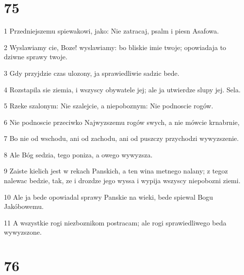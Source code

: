 \chapter{75}

\par 1 Przedniejszemu spiewakowi, jako: Nie zatracaj, psalm i piesn Asafowa.
\par 2 Wyslawiamy cie, Boze! wyslawiamy: bo bliskie imie twoje; opowiadaja to dziwne sprawy twoje.
\par 3 Gdy przyjdzie czas ulozony, ja sprawiedliwie sadzic bede.
\par 4 Rozstapila sie ziemia, i wszyscy obywatele jej; ale ja utwierdze slupy jej. Sela.
\par 5 Rzeke szalonym: Nie szalejcie, a niepoboznym: Nie podnoscie rogów.
\par 6 Nie podnoscie przeciwko Najwyzszemu rogów swych, a nie mówcie krnabrnie,
\par 7 Bo nie od wschodu, ani od zachodu, ani od puszczy przychodzi wywyzszenie.
\par 8 Ale Bóg sedzia, tego poniza, a owego wywyzsza.
\par 9 Zaiste kielich jest w rekach Panskich, a ten wina metnego nalany; z tegoz nalewac bedzie, tak, ze i drozdze jego wyssa i wypija wszyscy niepobozni ziemi.
\par 10 Ale ja bede opowiadal sprawy Panskie na wieki, bede spiewal Bogu Jakóbowemu.
\par 11 A wszystkie rogi niezboznikom postracam; ale rogi sprawiedliwego beda wywyzszone.

\chapter{76}

